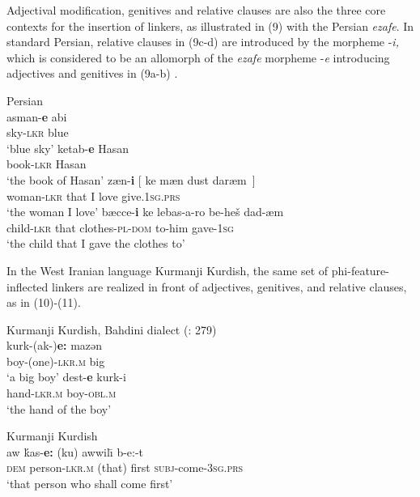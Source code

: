 \documentclass[output=paper]{langsci/langscibook}
\begin{document}
Adjectival modification, genitives and relative clauses are also the three core contexts for the insertion of linkers, as illustrated in (9) with the Persian \textit{ezafe}. In standard Persian, relative clauses in (9c-d) are introduced by the morpheme -\textit{i,} which is considered to be an allomorph of the \textit{ezafe} morpheme -\textit{e} introducing adjectives and genitives in (9a-b) \citep{Samvelian2007}.

\ea%
    Persian\label{ex:manzini:9}\\
    \ea
    \gll asman-\textbf{e}   abi     \\
         sky-\textsc{lkr}    blue\\
    \glt ‘blue sky’        
    \ex  
    \gll ketab-\textbf{e}   Hasan   \\
         book-\textsc{lkr}    Hasan\\
    \glt ‘the book of Hasan’ 
    \ex  
    \gll zæn-\textbf{i}     [ ke  mæn  dust  daræm~]\\
         woman-\textsc{lkr} {}  that   I   love  give.\textsc{1sg.prs}\\
    \glt ‘the woman I love’
    \ex
    \gll bæcce-\textbf{i}   ke   lebas-a-ro     be-heš dad-æm\\
         child-\textsc{lkr}    that   clothes-\textsc{pl-dom}    to-him gave-\textsc{1sg} \\
    \glt ‘the child that I gave the clothes to’
    \z
\z

In the West Iranian language Kurmanji Kurdish, the same set of phi-feature-inflected linkers are realized in front of adjectives, genitives, and relative clauses, as in (10)-(11).  

\ea%
    Kurmanji Kurdish, Bahdini dialect (\citealt{Franco2015}: 279)\label{ex:manzini:10}\\
    \ea
    \gll kurk-(ak-)\textbf{e:}     mazən    \\
         boy-(one){}-\textsc{lkr.m}    big\\
    \glt ‘a big boy’
    \ex  
    \gll dest-\textbf{e}     kurk-i\\
         hand{}-\textsc{lkr.m}    boy{}-\textsc{obl.m} \\
    \glt ‘the hand of the boy’
    \z
\z         

\ea%
    Kurmanji Kurdish \citep[203]{McKenzie1961}\label{ex:manzini:11}\\
    \gll aw   ḱas-\textbf{e:}     (ku)   {awwil\=\i} b-e:-t\\
         \textsc{dem}   person{}-\textsc{lkr.m}   (that)  first \textsc{subj}-come-\textsc{3sg.prs}\\
    \glt ‘that person who shall come first’
\z
\end{document}
